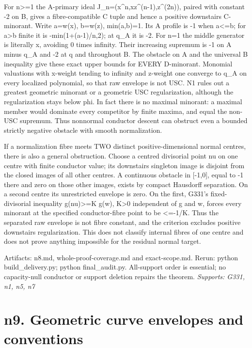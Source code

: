 \documentclass[11pt]{article}
\begin{document}
For n>=1 the A-primary ideal J\_n=(x\textasciicircum{}n,xz\textasciicircum{}(n-1),z\textasciicircum{}(2n)), paired with constant -2 on B, gives a fibre-compatible C tuple and hence a positive downstairs C-minorant. Write a=w(x), b=w(z), min(a,b)=1. Its A profile is -1 when a<=b; for a>b finite it is -min(1+(a-1)/n,2); at q\_A it is -2. For n=1 the middle generator is literally x, avoiding 0 times infinity. Their increasing supremum is -1 on A minus q\_A and -2 at q and throughout B. The obstacle on A and the universal B inequality give these exact upper bounds for EVERY D-minorant. Monomial valuations with x-weight tending to infinity and z-weight one converge to q\_A on every localized polynomial, so that raw envelope is not USC. N1 rules out a greatest geometric minorant or a geometric USC regularization, although the regularization stays below phi. In fact there is no maximal minorant: a maximal member would dominate every competitor by finite maxima, and equal the non-USC supremum. Thus nonnormal conductor descent can obstruct even a bounded strictly negative obstacle with smooth normalization.

If a normalization fibre meets TWO distinct positive-dimensional normal centres, there is also a general obstruction. Choose a centred divisorial point nu on one centre with finite conductor value; its downstairs singleton image is disjoint from the closed images of all other centres. A continuous obstacle in [-1,0], equal to -1 there and zero on those other images, exists by compact Hausdorff separation. On a second centre its unrestricted envelope is zero. On the first, G331's fixed-divisorial inequality g(nu)>=K g(w), K>0 independent of g and w, forces every minorant at the specified conductor-fibre point to be <=-1/K. Thus the separated raw envelope is not fibre constant, and the criterion excludes positive downstairs regularization. This does not classify internal fibres of one centre and does not prove anything impossible for the residual normal target.

Artifacts: n8.md, whole-proof-coverage.md and exact-scope.md. Rerun: python build\_delivery.py; python final\_audit.py. All-support order is essential; no capacity-null conductor or support deletion repairs the theorem.
\textit{Supports: G331, n1, n5, n7}

\section{n9. Geometric curve envelopes and conventions}
\end{document}

